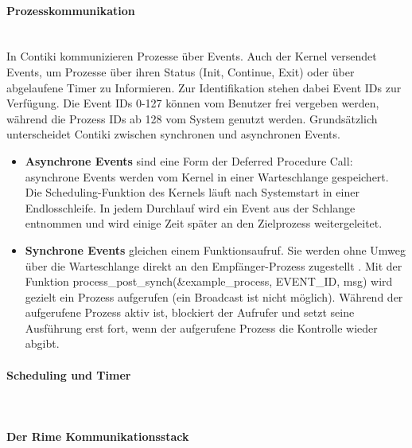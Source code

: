 \paragraph{Prozesskommunikation}\mbox{}\\
In Contiki kommunizieren Prozesse \"uber Events. Auch der Kernel versendet Events, um Prozesse \"uber ihren Status 
(Init, Continue, Exit) oder \"uber abgelaufene Timer zu Informieren. Zur Identifikation stehen dabei Event IDs zur 
Verf\"ugung. Die Event IDs 0-127 k\"onnen vom Benutzer frei vergeben werden, w\"ahrend die Prozess IDs ab 128 vom 
System genutzt werden. Grunds\"atzlich unterscheidet Contiki zwischen synchronen und asynchronen Events. 
\begin{itemize}
\item \textbf{Asynchrone Events} sind eine Form der Deferred Procedure Call: asynchrone Events werden vom Kernel in einer 
Warteschlange gespeichert. Die Scheduling-Funktion des Kernels l\"auft nach Systemstart in einer Endlosschleife. 
In jedem Durchlauf wird ein Event aus der Schlange entnommen und wird einige Zeit sp\"ater an den Zielprozess weitergeleitet.
\item \textbf{Synchrone Events} gleichen einem Funktionsaufruf.
Sie werden ohne Umweg \"uber die Warteschlange direkt an den Empf\"anger-Prozess
zugestellt \cite[vgl.][S. 7]{Walter:2010}.  Mit der Funktion process\_post\_synch(\&example\_process, EVENT\_ID, msg) wird gezielt ein 
Prozess aufgerufen (ein Broadcast ist nicht m\"oglich). W\"ahrend der aufgerufene Prozess aktiv ist, blockiert der Aufrufer und 
setzt seine Ausführung erst fort, wenn der aufgerufene Prozess die Kontrolle wieder abgibt.
\end{itemize}

\paragraph{Scheduling und Timer}\mbox{}\\

\paragraph{Der Rime Kommunikationsstack}\mbox{}\\




